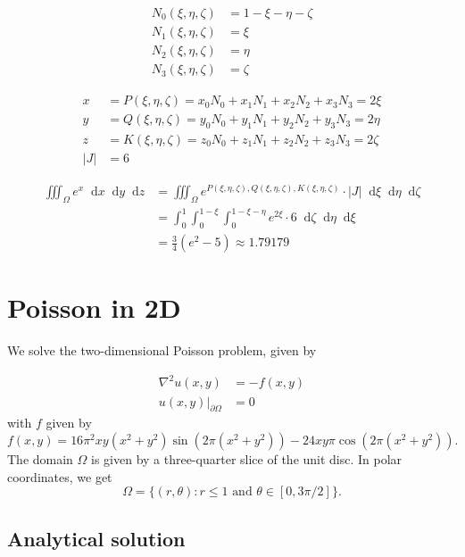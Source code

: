 \documentclass{report}
\renewcommand*\d{\mathop{}\!\mathrm{d}}
\begin{document}
\begin{align}
	N_0 (\xi,\eta,\zeta)&=1-\xi-\eta-\zeta\\ 
	N_1 (\xi,\eta,\zeta)&=\xi\\
	N_2 (\xi,\eta,\zeta)&=\eta\\
	N_3 (\xi,\eta,\zeta)&=\zeta
\end{align}

\begin{align}
	x&= P(\xi,\eta,\zeta)= x_0 N_0 +x_1 N_1 +x_2 N_2 +x_3 N_3 = 2\xi\\
	y&= Q(\xi,\eta,\zeta)= y_0 N_0 +y_1 N_1 +y_2 N_2 +y_3 N_3  = 2\eta\\ 
	z&= K(\xi,\eta,\zeta)= z_0 N_0 +z_1 N_1 +z_2 N_2 +z_3 N_3  = 2\zeta\\ 
	|J| &=6
\end{align}

\begin{align}
	\iiint_\Omega e^x \d x \d y \d z &= \iiint_\Omega e^{P(\xi,\eta,\zeta), Q(\xi,\eta,\zeta), K(\xi, \eta,\zeta)} \cdot |J| \d\xi \d\eta \d\zeta \\   
	&= \int_0^1 \int_0^{1-\xi} \int_0^{1-\xi-\eta} e^{2\xi} \cdot 6 \d\zeta \d\eta \d\xi \\
	&= \frac{3}{4}(e^2 - 5) \approx 1.79179
\end{align}


\section{Poisson in 2D}

We solve the two-dimensional Poisson problem, given by

\begin{align}
	\nabla^2 u(x,y) &= -f(x,y) \label{poissondirhom1} \\
	u(x,y)|_{\partial\Omega} &= 0 \label{poissondirhom2}
\end{align}
with $f$ given by
\begin{equation}
	f(x,y)=16\pi^2 xy(x^2 + y^2) \sin (2\pi (x^2 + y^2))-24xy\pi \cos (2\pi (x^2 + y^2)).
\end{equation}
The domain $\Omega$ is given by a three-quarter slice of the unit disc. In polar coordinates, we get
\begin{equation}
	\Omega = \{(r,\theta): r\le1 \text{ and } \theta \in [0,3\pi/2]\}.
\end{equation}

\subsection{Analytical solution}
\end{document}
